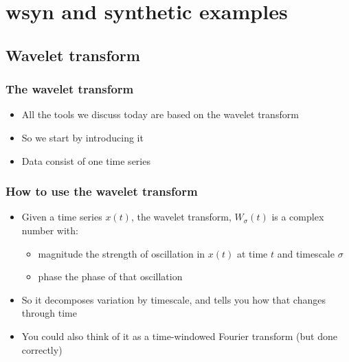 \documentclass{beamer}
\begin{document}



\section{wsyn and synthetic examples}

\subsection{Wavelet transform}

{
\begin{frame}
\frametitle{The wavelet transform}
\begin{itemize}
\item All the tools we discuss today are based on the wavelet transform
\item So we start by introducing it
\item Data consist of one time series
\end{itemize}
\end{frame}}

\begin{frame}
\frametitle{How to use the wavelet transform}
\begin{itemize}
\item Given a time series $x(t)$, the wavelet transform, $W_{\sigma}(t)$ is a complex number with:
\begin{itemize}
\item magnitude the strength of oscillation in $x(t)$ at time $t$ and timescale $\sigma$
\item phase the phase of that oscillation
\end{itemize}
\item So it decomposes variation by timescale, and tells you how that changes through time
\item You could also think of it as a time-windowed Fourier transform (but done correctly)
\end{itemize}
\end{frame}
\end{document}
